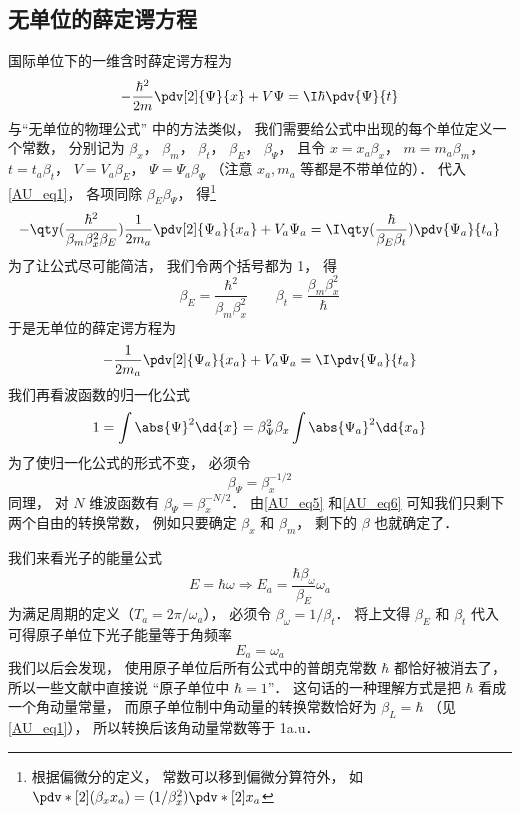 \subsection{无单位的薛定谔方程}
国际单位下的一维含时薛定谔方程为
\begin{equation}\label{AU_eq1}
-\frac{\hbar^2}{2m} \pdv[2]{\Psi}{x} + V\Psi= \I\hbar \pdv{\Psi}{t}
\end{equation}
与“无单位的物理公式” 中的方法类似， 我们需要给公式中出现的每个单位定义一个常数， 分别记为 $\beta_x$， $\beta_m$， $\beta_t$， $\beta_E$， $\beta_\Psi$， 且令 $x = x_a\beta_x$， $m = m_a\beta_m$， $t = t_a\beta_t$， $V = V_a\beta_E$， $\Psi = \Psi_a \beta_\Psi$ （注意 $x_a, m_a$ 等都是不带单位的）．
代入\autoref{AU_eq1}， 各项同除 $\beta_E\beta_\Psi$， 得\footnote{根据偏微分的定义， 常数可以移到偏微分算符外， 如 $\pdv*[2]{(\beta_x x_a)} = (1/\beta_x^2) \pdv*[2]{x_a}$}
\begin{equation}\label{AU_eq3}
-\qty(\frac{\hbar^2}{\beta_m\beta_x^2\beta_E})\frac{1}{2m_a} \pdv[2]{\Psi_a}{x_a} + V_a\Psi_a= \I\qty(\frac{\hbar}{\beta_E\beta_t})\pdv{\Psi_a}{t_a}
\end{equation}
为了让公式尽可能简洁， 我们令两个括号都为 1， 得
\begin{equation}\label{AU_eq6}
\beta_E = \frac{\hbar^2}{\beta_m\beta_x^2}
\qquad
\beta_t = \frac{\beta_m\beta_x^2}{\hbar}
\end{equation}
于是无单位的薛定谔方程为
\begin{equation}\label{AU_eq4}
-\frac{1}{2m_a} \pdv[2]{\Psi_a}{x_a} + V_a\Psi_a= \I\pdv{\Psi_a}{t_a}
\end{equation}
我们再看波函数的归一化公式
\begin{equation}
1 = \int \abs{\Psi}^2 \dd{x} = \beta_\Psi^2 \beta_x \int \abs{\Psi_a}^2 \dd{x_a}
\end{equation}
为了使归一化公式的形式不变， 必须令
\begin{equation}\label{AU_eq5}
\beta_\Psi = \beta_x^{-1/2}
\end{equation}
同理， 对 $N$ 维波函数有 $\beta_\Psi = \beta_x^{-N/2}$．
由\autoref{AU_eq5} 和\autoref{AU_eq6} 可知我们只剩下两个自由的转换常数， 例如只要确定 $\beta_x$ 和 $\beta_m$， 剩下的 $\beta$ 也就确定了．

我们来看光子的能量公式
\begin{equation}
E = \hbar \omega \Longrightarrow E_a = \frac{\hbar\beta_\omega}{\beta_E}\omega_a
\end{equation}
为满足周期的定义（$T_a = 2\pi/\omega_a$）， 必须令 $\beta_\omega = 1/\beta_t$． 将上文得 $\beta_E$ 和 $\beta_t$ 代入可得原子单位下光子能量等于角频率
\begin{equation}\label{AU_eq2}
E_a = \omega_a
\end{equation}
我们以后会发现， 使用原子单位后所有公式中的普朗克常数 $\hbar$ 都恰好被消去了， 所以一些文献中直接说 “原子单位中 $\hbar = 1$”． 这句话的一种理解方式是把 $\hbar$ 看成一个角动量常量， 而原子单位制中角动量的转换常数恰好为 $\beta_L = \hbar$ （见\autoref{AU_eq1}）， 所以转换后该角动量常数等于 1a.u．


